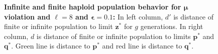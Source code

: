 \begin{figure}[!b]
\begin{center}
\hspace{-3em}%
\vspace{-0.5em} \hspace{-3em}%

\caption[\textbf{Infinite and finite haploid population behavior for $\bm{\mu}$ violation, genome length $\ell = 8$ and $\bm{\epsilon} = 0.1$}]
{\textbf{Infinite and finite haploid population behavior for $\bm{\mu}$ violation and $\ell = 8$ and $\bm{\epsilon} = 0.1$:} 
  In left column, $d'$ is distance of finite or infinite population to limit $\bm{z}^\ast$ for $g$ generations. 
  In right column, $d$ is distance of finite or infinite population to limits $\bm{p}^\ast$ and $\bm{q}^\ast$. Green line is distance to $\bm{p}^\ast$ and red line is distance to $\bm{q}^\ast$.}
\label{oscillation_8h_vio_mu_0.1}
\end{center}
\end{figure}

